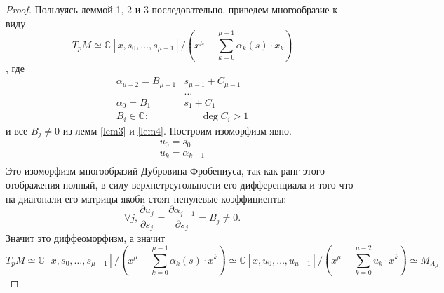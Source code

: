 \documentclass[a4paper, 10pt]{article}
\theoremstyle{plain}
\begin{document}
\begin{proof}
    Пользуясь леммой 1, 2 и 3 последовательно, приведем многообразие к виду 
    \[
    T_pM \simeq \mathbb{C}\left[x, s_0, \dots, s_{\mu - 1}\right]/\left(x^{\mu} - \sum_{k = 0}^{\mu - 1}\alpha_k (s)\cdot x_k\right)
    \]
    , где 
    \begin{align*}
        \alpha_{\mu - 2} = B_{\mu - 1}&s_{\mu - 1} + C_{\mu -1}\\
        &\dots\\
        \alpha_{0} = B_{1}&s_{1} + C_{1}\\
        B_i \in \mathbb{C};\hspace{20pt}& \hspace{20pt}\operatorname{deg}C_i > 1
    \end{align*} и все \(B_j \neq 0\) из лемм \ref{lem3} и \ref{lem4}.
    Построим изоморфизм явно.
    \[\begin{gathered}
        u_0 = s_0\\
        u_k = \alpha_{k-1}\\
    \end{gathered}
    \]
    Это изоморфизм многообразий Дубровина-Фробениуса, так как ранг этого отображения полный, в силу верхнетреугольности его дифференциала и того что на диагонали его матрицы якоби стоят ненулевые коэффициенты: \[\forall j, \dfrac{\partial u_j}{\partial s_j} = \dfrac{\partial \alpha_{j-1}}{\partial s_j} = B_j \neq 0.\] Значит это диффеоморфизм, а значит 
    \[T_pM \simeq \mathbb{C}\left[x, s_0, \dots, s_{\mu - 1}\right]/\left(x^{\mu} - \sum_{k = 0}^{\mu - 1}\alpha_k (s)\cdot x^k\right) \simeq \mathbb{C}\left[x, u_0, \dots, u_{\mu - 1}\right]/\left(x^{\mu} - \sum_{k = 0}^{\mu - 2} u_k\cdot x^k\right) \simeq M_{A_\mu}\]
\end{proof}
\newpage
\printbibliography
\end{document}
